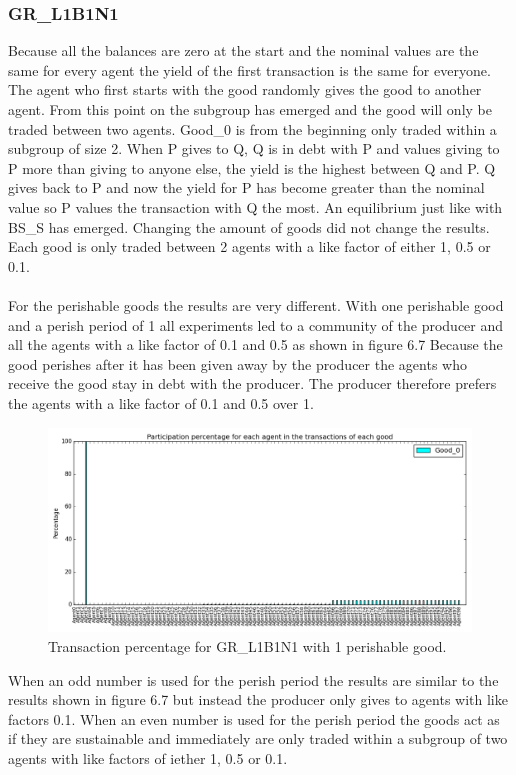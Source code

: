 \documentclass[twoside,openright]{uva-bachelor-thesis}
\begin{document}
\subsubsection{GR\_L1B1N1}
Because all the balances are zero at the start and the nominal values are the same for every agent the yield of the first transaction is the same for everyone. The agent who first starts with the good randomly gives the good to another agent. From this point on the subgroup has emerged and the good will only be traded between two agents. Good\_0 is from the beginning only traded within a subgroup of size 2. When P gives to Q, Q is in debt with P and values giving to P more than giving to anyone else, the yield is the highest between Q and P. Q gives back to P and now the yield for P has become greater than the nominal value so P values the transaction with Q the most. An equilibrium just like with BS\_S has emerged. Changing the amount of goods did not change the results. Each good is only traded between 2 agents with a like factor of either 1, 0.5 or 0.1.
\\
\\
For the perishable goods the results are very different. With one perishable good and a perish period of 1 all experiments led to a community of the producer and all the agents with a like factor of 0.1 and 0.5 as shown in figure 6.7 Because the good perishes after it has been given away by the producer the agents who receive the good stay in debt with the producer. The producer therefore prefers the agents with a like factor of 0.1 and 0.5 over 1. \\
\begin{figure}[h!]
\centering
\includegraphics[scale=0.4]{Simulation_figures/GR_L1B1N1/1perishable_1-1_15k}
\caption{Transaction percentage for GR\_L1B1N1 with 1 perishable good.}
\end{figure}

When an odd number is used for the perish period the results are similar to the results shown in figure 6.7 but instead the producer only gives to agents with like factors 0.1. When an even number is used for the perish period the goods act as if they are sustainable and immediately are only traded within a subgroup of two agents with like factors of iether 1, 0.5 or 0.1. 
\end{document}
